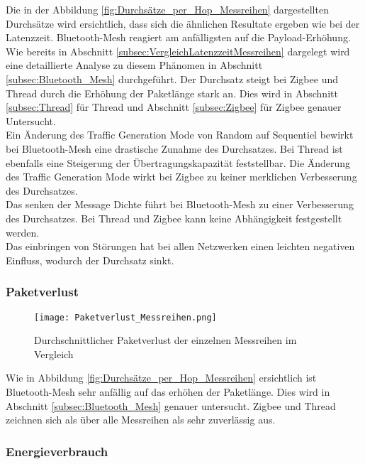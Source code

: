 Die in der Abbildung \ref{fig:Durchsätze_per_Hop_Messreihen} dargestellten Durchsätze wird ersichtlich, dass sich die ähnlichen Resultate ergeben wie bei der Latenzzeit. Bluetooth-Mesh reagiert am anfälligsten auf die Payload-Erhöhung. Wie bereits in Abschnitt \ref{subsec:VergleichLatenzzeitMessreihen} dargelegt wird eine detaillierte Analyse zu diesem Phänomen in Abschnitt \ref{subsec:Bluetooth_Mesh} durchgeführt. Der Durchsatz steigt bei Zigbee und Thread durch die Erhöhung der Paketlänge stark an. Dies wird in Abschnitt \ref{subsec:Thread} für Thread und Abschnitt \ref{subsec:Zigbee} für Zigbee genauer Untersucht. \\

Ein Änderung des Traffic Generation Mode von Random auf Sequentiel bewirkt bei Bluetooth-Mesh eine drastische Zunahme des Durchsatzes. Bei Thread ist ebenfalls eine Steigerung der Übertragungskapazität feststellbar. Die Änderung des Traffic Generation Mode wirkt bei Zigbee zu keiner merklichen Verbesserung des Durchsatzes.\\

Das senken der Message Dichte führt bei Bluetooth-Mesh zu einer Verbesserung des Durchsatzes. Bei Thread und Zigbee kann keine Abhängigkeit festgestellt werden. \\

Das einbringen von Störungen hat bei allen Netzwerken einen leichten negativen Einfluss, wodurch der Durchsatz sinkt. 

\subsubsection{Paketverlust}\label{subsec:VergleichPaketverlustMessreihen}


\begin{figure}
	\centering
	\texttt{[image: Paketverlust\_Messreihen.png]}
	\caption{Durchschnittlicher Paketverlust der einzelnen Messreihen im Vergleich}\label{fig:PaketverlusteMessreihen}
\end{figure}

Wie in Abbildung \ref{fig:Durchsätze_per_Hop_Messreihen} ersichtlich ist Bluetooth-Mesh sehr anfällig auf das erhöhen der Paketlänge. Dies wird in Abschnitt \ref{subsec:Bluetooth_Mesh} genauer untersucht. Zigbee und Thread zeichnen sich als über alle Messreihen als sehr zuverlässig aus. 


\subsubsection{Energieverbrauch}\label{subsec:VergleichEnergieverbrauchMessreihen}


